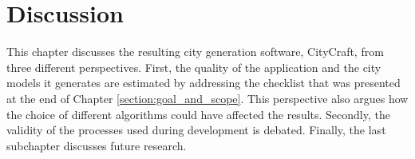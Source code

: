 \chapter{Discussion}

This chapter discusses the resulting city generation software, CityCraft, from three different perspectives.
First, the quality of the application and the city models it generates are estimated by addressing the checklist that was presented at the end of Chapter \ref{section:goal_and_scope}.
This perspective also argues how the choice of different algorithms could have affected the results.
Secondly, the validity of the processes used during development is debated.
Finally, the last subchapter discusses future research.




